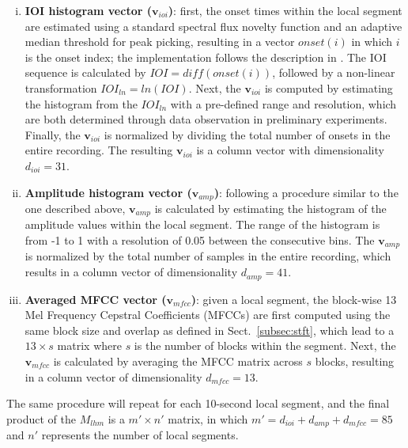 \documentclass[conference]{IEEEtran}
\begin{document}
\begin{enumerate}[(i)]
    \item   \textbf{IOI histogram vector ($\mathbf{v}_{ioi}$)}: first, the onset times within the local segment are estimated using a standard spectral flux novelty function and an adaptive median threshold for peak picking, resulting in a vector $onset(i)$ in which $i$ is the onset index; the implementation follows the description in \cite{Lerch2012}. The IOI sequence is calculated by $IOI = diff(onset(i))$, followed by a non-linear transformation $IOI_{ln} = ln(IOI)$. Next, the $\mathbf{v}_{ioi}$ is computed by estimating the histogram from the $IOI_{ln}$ with a pre-defined range and resolution, which are both determined through data observation in preliminary experiments. Finally, the $\mathbf{v}_{ioi}$ is normalized by dividing the total number of onsets in the entire recording. The resulting $\mathbf{v}_{ioi}$ is a column vector with dimensionality $d_{ioi} = 31$.

    \item   \textbf{Amplitude histogram vector ($\mathbf{v}_{amp}$)}: following a procedure similar to the one described above, $\mathbf{v}_{amp}$ is calculated by estimating the histogram of the amplitude values within the local segment. The range of the histogram is from -1 to 1 with a resolution of 0.05 between the consecutive bins. The $\mathbf{v}_{amp}$ is normalized by the total number of samples in the entire recording, which results in a column vector of dimensionality $d_{amp} = 41$.  

    \item   \textbf{Averaged MFCC vector ($\mathbf{v}_{mfcc}$)}: given a local segment, the block-wise 13 Mel Frequency Cepstral Coefficients (MFCCs) are first computed using the same block size and overlap as defined in Sect.~\ref{subsec:stft}, which lead to a $13 \times s$ matrix where $s$ is the number of blocks within the segment. Next, the $\mathbf{v}_{mfcc}$ is calculated by averaging the MFCC matrix across $s$ blocks, resulting in a column vector of dimensionality $d_{mfcc} = 13$. 
\end{enumerate} 

The same procedure will repeat for each 10-second local segment, and the final product of the $M_{lhm}$ is a $m' \times n'$ matrix,  in which $m' = d_{ioi} + d_{amp} + d_{mfcc} = 85$ and $n'$ represents the number of local segments.
\end{document}
